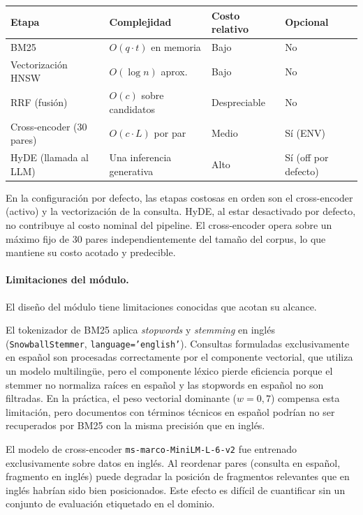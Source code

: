 \documentclass[11pt]{article}
\begin{document}
\begin{center}
\begin{tabular}{llll}
\hline
\textbf{Etapa} & \textbf{Complejidad} & \textbf{Costo relativo} & \textbf{Opcional} \\
\hline
BM25 & $O(q \cdot t)$ en memoria & Bajo & No \\
Vectorización HNSW & $O(\log n)$ aprox. & Bajo & No \\
RRF (fusión) & $O(c)$ sobre candidatos & Despreciable & No \\
Cross-encoder (30 pares) & $O(c \cdot L)$ por par & Medio & Sí (ENV) \\
HyDE (llamada al LLM) & Una inferencia generativa & Alto & Sí (off por defecto) \\
\hline
\end{tabular}
\end{center}

En la configuración por defecto, las etapas costosas en orden son el cross-encoder (activo) y
la vectorización de la consulta. HyDE, al estar desactivado por defecto, no contribuye al
costo nominal del pipeline. El cross-encoder opera sobre un máximo fijo de 30 pares
independientemente del tamaño del corpus, lo que mantiene su costo acotado y predecible.

\paragraph{Limitaciones del módulo.}
El diseño del módulo tiene limitaciones conocidas que acotan su alcance.

El tokenizador de BM25 aplica \emph{stopwords} y \emph{stemming} en inglés
(\texttt{SnowballStemmer}, \texttt{language='english'}). Consultas formuladas exclusivamente
en español son procesadas correctamente por el componente vectorial, que utiliza un modelo
multilingüe, pero el componente léxico pierde eficiencia porque el stemmer no normaliza raíces
en español y las stopwords en español no son filtradas. En la práctica, el peso vectorial
dominante ($w=0{,}7$) compensa esta limitación, pero documentos con términos técnicos en
español podrían no ser recuperados por BM25 con la misma precisión que en inglés.

El modelo de cross-encoder \texttt{ms-marco-MiniLM-L-6-v2} fue entrenado exclusivamente sobre
datos en inglés. Al reordenar pares (consulta en español, fragmento en inglés) puede degradar
la posición de fragmentos relevantes que en inglés habrían sido bien posicionados. Este efecto
es difícil de cuantificar sin un conjunto de evaluación etiquetado en el dominio.
\end{document}

